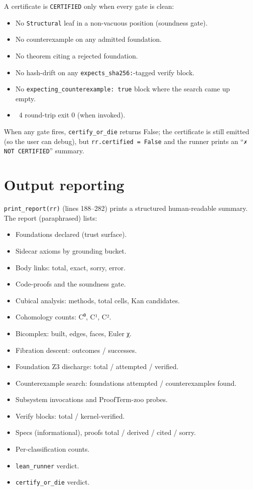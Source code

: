 A certificate is \texttt{CERTIFIED} only when every gate is clean:
\begin{itemize}[leftmargin=1.7em]
  \item No \texttt{Structural} leaf in a non-vacuous position
    (soundness gate).
  \item No counterexample on any admitted foundation.
  \item No theorem citing a rejected foundation.
  \item No hash-drift on any \texttt{expects\_sha256:}-tagged
    verify block.
  \item No \texttt{expecting\_counterexample: true} block where
    the search came up empty.
  \item \Lean{}~4 round-trip exit 0 (when invoked).
\end{itemize}

When any gate fires, \texttt{certify\_or\_die} returns False; the
certificate is still emitted (so the user can debug), but
\texttt{rr.certified = False} and the runner prints an
``\texttt{✗ NOT CERTIFIED}'' summary.

\section{Output reporting}

\texttt{print\_report(rr)} (lines 188--282) prints a structured
human-readable summary.  The report (paraphrased) lists:
\begin{itemize}[leftmargin=1.7em]
  \item Foundations declared (trust surface).
  \item Sidecar axioms by grounding bucket.
  \item Body links: total, exact, sorry, error.
  \item Code-proofs and the soundness gate.
  \item Cubical analysis: methods, total cells, Kan candidates.
  \item Cohomology counts: C⁰, C¹, C².
  \item Bicomplex: built, edges, faces, Euler χ.
  \item Fibration descent: outcomes / successes.
  \item Foundation Z3 discharge: total / attempted / verified.
  \item Counterexample search: foundations attempted /
    counterexamples found.
  \item Subsystem invocations and ProofTerm-zoo probes.
  \item Verify blocks: total / kernel-verified.
  \item Specs (informational), proofs total / derived / cited /
    sorry.
  \item Per-classification counts.
  \item \texttt{lean\_runner} verdict.
  \item \texttt{certify\_or\_die} verdict.
\end{itemize}

